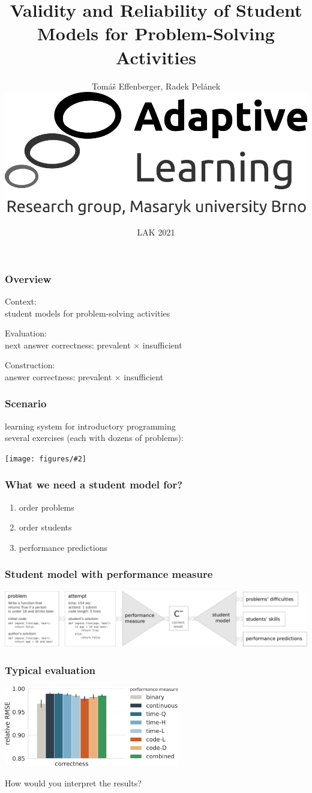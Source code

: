 \documentclass[bigger]{beamer}
\title{Validity and Reliability of Student Models for Problem-Solving Activities}
\author{Tom\'a\v{s} Effenberger, Radek Pel\'anek\\[5mm]
\includegraphics[width=.35\linewidth]{figures/al-logo}\\[3mm]
}
\date{LAK 2021}
\newcommand{\img}[2]{
  \begin{center}
    \texttt{[image: figures/\#2]}
  \end{center}
}
\newcommand{\mute}[1]{
  {\color{gray}{#1}}
}
\begin{document}
\frame{\titlepage}


\begin{frame}
  \frametitle{Overview}

  Context:\\student models for problem-solving activities
  \bigskip
  \pause

  Evaluation:\\
  next answer correctness: prevalent $\times$ insufficient
  \bigskip
  \pause

  Construction:\\
  answer correctness: prevalent $\times$ insufficient
\end{frame}


\begin{frame}
  \frametitle{Scenario}
  learning system for introductory programming\\
  several exercises (each with dozens of problems):
  \img{1.0}{exercises}
\end{frame}


\begin{frame}
  \frametitle{What we need a student model for?}
  \begin{enumerate}
    \item order problems
    \item order students
    \item performance predictions
  \end{enumerate}
\end{frame}


\begin{frame}
  \frametitle{Student model with performance measure}
  \hspace*{-0.9cm}
  \includegraphics[width=1.15\linewidth]{figures/pipeline}
\end{frame}

\begin{frame}
  \frametitle{Typical evaluation}
  \includegraphics[height=3.5cm]{figures/next-answer-correctness}


  \bigskip
  How would you interpret the results?
\end{frame}
\end{document}
